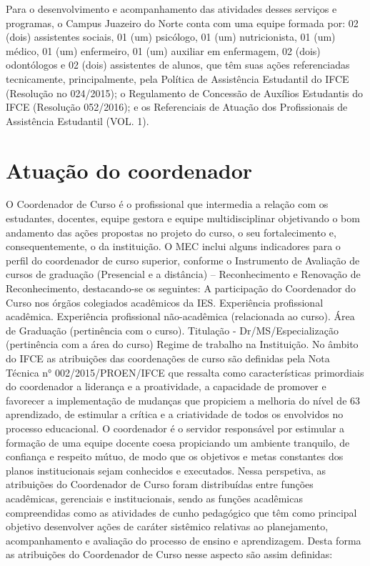 Para o desenvolvimento e acompanhamento das atividades desses serviços e programas, o Campus Juazeiro do Norte conta com uma equipe formada por: 02 (dois) assistentes sociais, 01 (um) psicólogo, 01 (um) nutricionista, 01 (um) médico, 01 (um) enfermeiro, 01 (um) auxiliar em enfermagem, 02 (dois) odontólogos e 02 (dois) assistentes de alunos, que têm suas ações referenciadas tecnicamente, principalmente, pela Política de Assistência Estudantil do IFCE (Resolução no 024/2015); o Regulamento de Concessão de Auxílios Estudantis do IFCE (Resolução 052/2016); e os Referenciais de Atuação dos Profissionais de Assistência Estudantil (VOL. 1).\\

\chapter{Atuação do coordenador}

O Coordenador de Curso é o profissional que intermedia a relação com os estudantes, docentes, equipe gestora e equipe multidisciplinar objetivando o bom andamento das ações propostas no projeto do curso, o seu fortalecimento e, consequentemente, o da instituição. O MEC inclui alguns indicadores para o perfil do coordenador de curso superior, conforme o Instrumento de Avaliação de cursos de graduação (Presencial e a distância) – Reconhecimento e Renovação de Reconhecimento, destacando-se os seguintes: A participação do Coordenador do Curso nos órgãos colegiados acadêmicos da IES. Experiência profissional acadêmica. Experiência profissional não-acadêmica (relacionada ao curso). Área de Graduação (pertinência com o curso). Titulação - Dr/MS/Especialização (pertinência com a área do curso) Regime de trabalho na Instituição. No âmbito do IFCE as atribuições das coordenações de curso são definidas pela Nota Técnica n° 002/2015/PROEN/IFCE que ressalta como características primordiais do coordenador a liderança e a proatividade, a capacidade de promover e favorecer a implementação de mudanças que propiciem a melhoria do nível de 63 aprendizado, de estimular a crítica e a criatividade de todos os envolvidos no processo educacional. O coordenador é o servidor responsável por estimular a formação de uma equipe docente coesa propiciando um ambiente tranquilo, de confiança e respeito mútuo, de modo que os objetivos e metas constantes dos planos institucionais sejam conhecidos e executados. Nessa perspetiva, as atribuições do Coordenador de Curso foram distribuídas entre funções acadêmicas, gerenciais e institucionais, sendo as funções acadêmicas compreendidas como as atividades de cunho pedagógico que têm como principal objetivo desenvolver ações de caráter sistêmico relativas ao planejamento, acompanhamento e avaliação do processo de ensino e aprendizagem. Desta forma as atribuições do Coordenador de Curso nesse aspecto são assim definidas:

